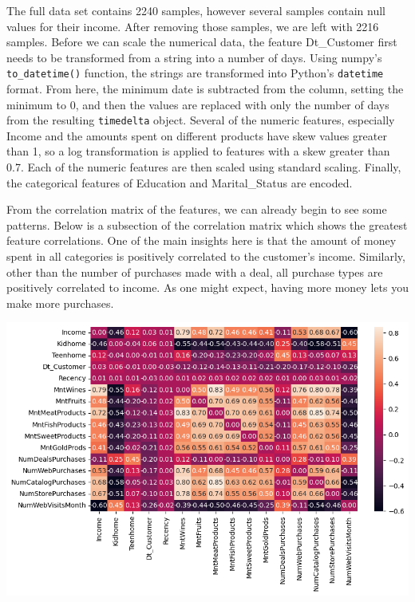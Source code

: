 \documentclass[12pt]{article}
\begin{document}

The full data set contains 2240 samples, however several samples contain null values for their income. After removing those samples, we are left with 2216 samples. Before we can scale the numerical data, the feature Dt\_Customer first needs to be transformed from a string into a number of days. Using numpy's \texttt{to\_datetime()} function, the strings are transformed into Python's \texttt{datetime} format. From here, the minimum date is subtracted from the column, setting the minimum to 0, and then the values are replaced with only the number of days from the resulting \texttt{timedelta} object. Several of the numeric features, especially Income and the amounts spent on different products have skew values greater than 1, so a log transformation is applied to features with a skew greater than 0.7. Each of the numeric features are then scaled using standard scaling. Finally, the categorical features of Education and Marital\_Status are encoded. 

From the correlation matrix of the features, we can already begin to see some patterns. Below is a subsection of the correlation matrix which shows the greatest feature correlations. One of the main insights here is that the amount of money spent in all categories is positively correlated to the customer's income. Similarly, other than the number of purchases made with a deal, all purchase types are positively correlated to income. As one might expect, having more money lets you make more purchases. 
\begin{center}
    \includegraphics[width=6.5in]{images/corr_mat.png}
\end{center}
\end{document}
